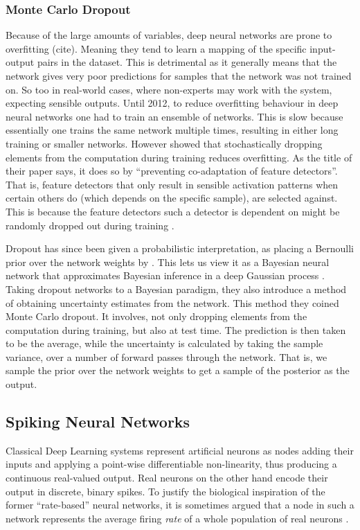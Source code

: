 \documentclass[10pt,a4paper,twocolumn]{article}
\begin{document}
\subsubsection{Monte Carlo Dropout}
Because of the large amounts of variables, deep neural networks are prone to overfitting (cite). Meaning they tend to learn a mapping of the specific input-output pairs in the dataset. This is detrimental as it generally means that the network gives very poor predictions for samples that the network was not trained on. So too in real-world cases, where non-experts may work with the system, expecting sensible outputs. Until 2012, to reduce overfitting behaviour in deep neural networks one had to train an ensemble of networks. This is slow because essentially one trains the same network multiple times, resulting in either long training or smaller networks. However  showed that stochastically dropping elements from the computation during training reduces overfitting. As the title of their paper says, it does so by ``preventing co-adaptation of feature detectors''. That is, feature detectors that only result in sensible activation patterns when certain others do (which depends on the specific sample), are selected against. This is because the feature detectors such a detector is dependent on might be randomly dropped out during training \cite{srivastava2014dropout}.

Dropout has since been given a probabilistic interpretation, as placing a Bernoulli prior over the network weights by . This lets us view it as a Bayesian neural network that approximates Bayesian inference in a deep Gaussian process \cite{gal2016dropout}. Taking dropout networks to a Bayesian paradigm, they also introduce a method of obtaining uncertainty estimates from the network. This method they coined Monte Carlo dropout. It involves, not only dropping elements from the computation during training, but also at test time. The prediction is then taken to be the average, while the uncertainty is calculated by taking the sample variance, over a number of forward passes through the network.
That is, we sample the prior over the network weights to get a sample of the posterior as the output.

\subsection{Spiking Neural Networks}
Classical Deep Learning systems represent artificial neurons as nodes adding their inputs and applying a point-wise differentiable non-linearity, thus producing a continuous real-valued output. Real neurons on the other hand encode their output in discrete, binary spikes. To justify the biological inspiration of the former ``rate-based'' neural networks, it is sometimes argued that a node in such a network represents the average firing \emph{rate} of a whole population of real neurons \cite{rolls1998neural}. 
\end{document}
